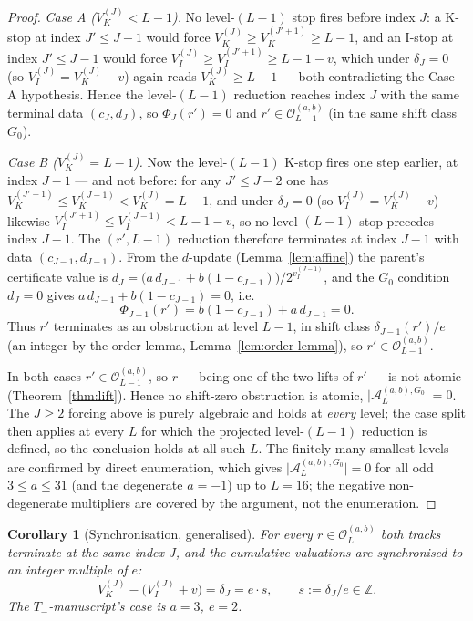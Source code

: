 \documentclass[11pt,reqno]{amsart}
\theoremstyle{plain}
\newtheorem{corollary}[theorem]{Corollary}
\theoremstyle{definition}
\theoremstyle{remark}
\newcommand{\Tneg}{T_{-}}
\newcommand{\Z}{\mathbb{Z}}
\newcommand{\Obs}{\mathcal{O}}
\newcommand{\Atom}{\mathcal{A}}
\newcommand{\Vk}{V_{K}}
\newcommand{\Vi}{V_{I}}
\newcommand{\vi}{v_{I}}
\newcommand{\Obsab}{\Obs_{L}^{(a,b)}}
\begin{document}
\begin{proof}
\emph{Case A ($\Vk^{(J)} < L-1$).} No level-$(L-1)$ stop fires before
index $J$: a K-stop at index $J' \le J-1$ would force
$\Vk^{(J)} \ge \Vk^{(J'+1)} \ge L-1$, and an I-stop at index $J' \le J-1$
would force $\Vi^{(J)} \ge \Vi^{(J'+1)} \ge L-1-v$, which under
$\delta_J = 0$ (so $\Vi^{(J)} = \Vk^{(J)} - v$) again reads
$\Vk^{(J)} \ge L-1$ --- both contradicting the Case-A hypothesis. Hence the
level-$(L-1)$ reduction reaches index $J$ with the same terminal data
$(c_J, d_J)$, so $\Phi_J(r') = 0$ and $r' \in \Obs_{L-1}^{(a,b)}$ (in the
same shift class $G_0$).

\emph{Case B ($\Vk^{(J)} = L-1$).} Now the level-$(L-1)$ K-stop fires one
step earlier, at index $J-1$ --- and not before: for any $J' \le J-2$ one
has $\Vk^{(J'+1)} \le \Vk^{(J-1)} < \Vk^{(J)} = L-1$, and under $\delta_J = 0$
(so $\Vi^{(J)} = \Vk^{(J)} - v$) likewise
$\Vi^{(J'+1)} \le \Vi^{(J-1)} < L-1-v$, so no level-$(L-1)$ stop precedes
index $J-1$. The $(r', L-1)$ reduction therefore terminates at index $J-1$
with data $(c_{J-1}, d_{J-1})$. From the $d$-update (Lemma~\ref{lem:affine}) the
parent's certificate value is
$d_J = \bigl(a\,d_{J-1} + b(1 - c_{J-1})\bigr)/2^{\vi^{(J-1)}}$, and the
$G_0$ condition $d_J = 0$ gives $a\,d_{J-1} + b(1 - c_{J-1}) = 0$, i.e.\
\[
\Phi_{J-1}(r') = b(1 - c_{J-1}) + a\,d_{J-1} = 0.
\]
Thus $r'$ terminates as an obstruction at level $L-1$, in shift class
$\delta_{J-1}(r')/e$ (an integer by the order lemma,
Lemma~\ref{lem:order-lemma}), so $r' \in \Obs_{L-1}^{(a,b)}$.

In both cases $r' \in \Obs_{L-1}^{(a,b)}$, so $r$ --- being one of the two
lifts of $r'$ --- is not atomic (Theorem~\ref{thm:lift}). Hence no
shift-zero obstruction is atomic, $\lvert \Atom_L^{(a,b), G_0} \rvert = 0$.
The $J \ge 2$ forcing above is purely algebraic and holds at \emph{every}
level; the case split then applies at every $L$ for which the projected
level-$(L-1)$ reduction is defined, so the conclusion holds at all such
$L$. The finitely many smallest levels are confirmed by direct
enumeration, which gives $\lvert \Atom_L^{(a,b), G_0} \rvert = 0$ for all
odd $3 \le a \le 31$ (and the degenerate $a = -1$) up to $L = 16$; the
negative non-degenerate multipliers are covered by the argument, not the
enumeration. \qedhere
\end{proof}

\begin{corollary}[Synchronisation, generalised]\label{cor:sync-general}
For every $r \in \Obsab$ both tracks terminate at the same index $J$, and
the cumulative valuations are synchronised to an integer multiple of $e$:
\[
\Vk^{(J)} - \bigl(\Vi^{(J)} + v\bigr) = \delta_J = e \cdot s, \qquad s := \delta_J / e \in \Z.
\]
The $\Tneg$-manuscript's case is $a = 3$, $e = 2$.
\end{corollary}
\end{document}
